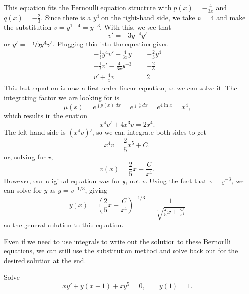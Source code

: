 \begin{exampleSol}
This equation fits the Bernoulli equation structure with $p(x) = -\frac{4}{3x}$ and $q(x) = -\frac{2}{3}$. Since there is a $y^4$ on the right-hand side, we take $n=4$ and make the substitution $v = y^{1-4} = y^{-3}$. With this, we see that
\begin{equation*}
v' = -3 y^{-4} y'
\end{equation*}
or $y' = -\nicefrac{1}{3}y^4 v'$. Plugging this into the equation gives
\begin{equation*}
\begin{split}
-\frac{1}{3} y^4 v' - \frac{4}{3x}y &= -\frac{2}{3}y^4 \\
-\frac{1}{3} v' - \frac{4}{3x} y^{-3} &= -\frac{2}{3} \\
v' + \frac{4}{x} v &= 2
\end{split}
\end{equation*}
This last equation is now a first order linear equation, so we can solve it. The integrating factor we are looking for is 
\begin{equation*}
 \mu(x) = e^{\int p(x)\ dx} = e^{\int \frac{4}{x}\ dx} = e^{4\ln{x}} = x^4, 
\end{equation*}
which results in the euation
\begin{equation*}
x^4 v' + 4x^3 v = 2x^4.
\end{equation*}
The left-hand side is $(x^4v)'$, so we can integrate both sides to get
\begin{equation*}
x^4 v = \frac{2}{5}x^5 + C,
\end{equation*}
or, solving for $v$, 
\begin{equation*}
v(x) = \frac{2}{5} x + \frac{C}{x^4}.
\end{equation*}
However, our original equation was for $y$, not $v$. Using the fact that $v = y^{-3}$, we can solve for $y$ as $y = v^{-1/3}$, giving
\begin{equation*}
y(x) = \left(\frac{2}{5}x + \frac{C}{x^4}\right)^{-1/3} = \frac{1}{\sqrt[3]{\frac{2}{5}x + \frac{C}{x^4}}}
\end{equation*}
as the general solution to this equation. 
\end{exampleSol}

Even if we need to use integrals to write out the solution to these Bernoulli equations, we can still use the substitution method and solve back out for the desired solution at the end.

\begin{example}
Solve
\begin{equation*}
xy'+ y(x+1)+xy^5 = 0, \qquad y(1)=1 .
\end{equation*}
\end{example}


